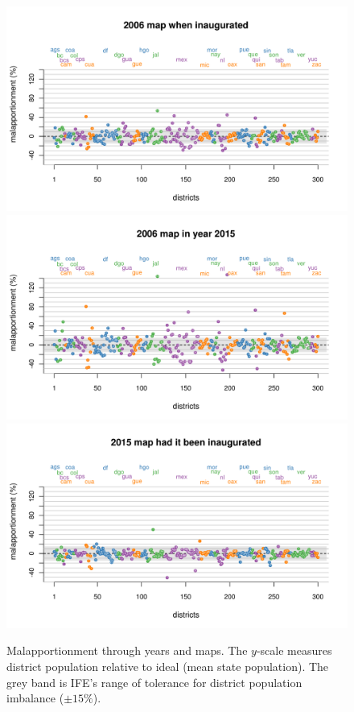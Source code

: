 \documentclass[letter,12pt]{article}
\begin{document}
\begin{figure}
\begin{center}
    \includegraphics[width=.7\columnwidth]{malapp2006d0.pdf} \\
    \includegraphics[width=.7\columnwidth]{malapp2015d0.pdf} \\
    \includegraphics[width=.7\columnwidth]{malapp2015d3.pdf} \\
  \caption{Malapportionment through years and maps. The $y$-scale measures district population relative to ideal (mean state population). The grey band is IFE's range of tolerance for district population imbalance ($\pm15\%$).}\label{F:malapp}
\end{center}
\end{figure}
\end{document}
